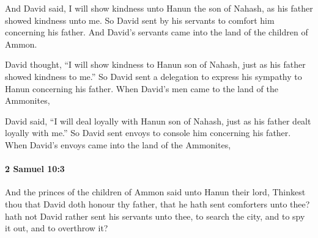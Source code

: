 			\begin{versebox}
					\item[BHS] 
					\item[ASV] And David said, I will show kindness unto Hanun the son of Nahash, as his father showed kindness unto me. So David sent by his servants to comfort him concerning his father. And David's servants came into the land of the children of Ammon.
					\item[NIV] David thought, “I will show kindness to Hanun son of Nahash, just as his father showed kindness to me.” So David sent a delegation to express his sympathy to Hanun concerning his father. When David’s men came to the land of the Ammonites,
					\item[NRSV] David said, “I will deal loyally with Hanun son of Nahash, just as his father dealt loyally with me.” So David sent envoys to console him concerning his father. When David’s envoys came into the land of the Ammonites,
			\end{versebox}

		\paragraph{2 Samuel 10:3} %
			\label{2SAMUEL-10-3}

			And the princes of the children of Ammon said unto Hanun their lord, Thinkest thou that David doth honour thy father, that he hath sent comforters unto thee? hath not David rather sent his servants unto thee, to search the city, and to spy it out, and to overthrow it?

